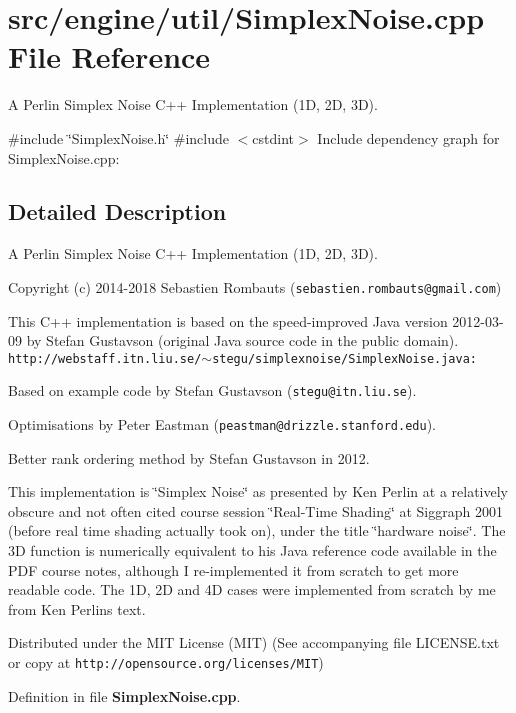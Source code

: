 \section{src/engine/util/\+Simplex\+Noise.cpp File Reference}
\label{_simplex_noise_8cpp}


A Perlin Simplex Noise C++ Implementation (1D, 2D, 3D).  


{\ttfamily \#include \char`\"{}Simplex\+Noise.\+h\char`\"{}}\newline
{\ttfamily \#include $<$cstdint$>$}\newline
Include dependency graph for Simplex\+Noise.\+cpp\+:


\subsection{Detailed Description}
A Perlin Simplex Noise C++ Implementation (1D, 2D, 3D). 

Copyright (c) 2014-\/2018 Sebastien Rombauts ({\tt sebastien.\+rombauts@gmail.\+com})

This C++ implementation is based on the speed-\/improved Java version 2012-\/03-\/09 by Stefan Gustavson (original Java source code in the public domain). {\tt http\+://webstaff.\+itn.\+liu.\+se/$\sim$stegu/simplexnoise/\+Simplex\+Noise.\+java\+:}
\begin{DoxyItemize}
\item Based on example code by Stefan Gustavson ({\tt stegu@itn.\+liu.\+se}).
\item Optimisations by Peter Eastman ({\tt peastman@drizzle.\+stanford.\+edu}).
\item Better rank ordering method by Stefan Gustavson in 2012.
\end{DoxyItemize}

This implementation is \char`\"{}\+Simplex Noise\char`\"{} as presented by Ken Perlin at a relatively obscure and not often cited course session \char`\"{}\+Real-\/\+Time Shading\char`\"{} at Siggraph 2001 (before real time shading actually took on), under the title \char`\"{}hardware noise\char`\"{}. The 3D function is numerically equivalent to his Java reference code available in the P\+DF course notes, although I re-\/implemented it from scratch to get more readable code. The 1D, 2D and 4D cases were implemented from scratch by me from Ken Perlin\textquotesingle{}s text.

Distributed under the M\+IT License (M\+IT) (See accompanying file L\+I\+C\+E\+N\+S\+E.\+txt or copy at {\tt http\+://opensource.\+org/licenses/\+M\+IT}) 

Definition in file \textbf{ Simplex\+Noise.\+cpp}.


